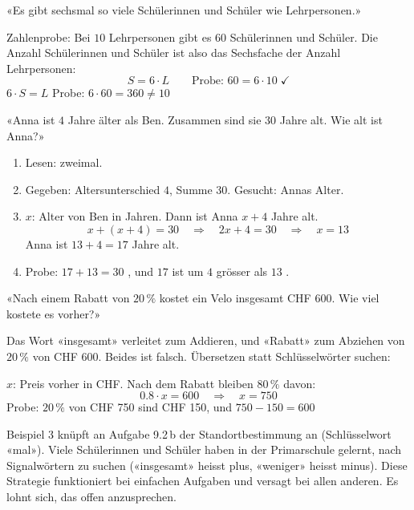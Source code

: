 \documentclass[11pt]{exam}
\begin{document}
\begin{beispiel}
«Es gibt sechsmal so viele Schülerinnen und Schüler wie Lehrpersonen.»

Zahlenprobe: Bei $10$ Lehrpersonen gibt es $60$ Schülerinnen und Schüler.
Die Anzahl Schülerinnen und Schüler ist also das Sechsfache der Anzahl
Lehrpersonen:
\[ S = 6 \cdot L \qquad\text{Probe: } 60 = 6 \cdot 10 \;\checkmark \]
\falsch\quad $6 \cdot S = L$ \qquad Probe: $6 \cdot 60 = 360 \neq 10$
\end{beispiel}

\begin{beispiel}
«Anna ist $4$ Jahre älter als Ben. Zusammen sind sie $30$ Jahre alt. Wie alt
ist Anna?»
\begin{enumerate}
  \item[1.] Lesen: zweimal.
  \item[2.] Gegeben: Altersunterschied $4$, Summe $30$. Gesucht: Annas Alter.
  \item[3.] $x$: Alter von Ben in Jahren. Dann ist Anna $x + 4$ Jahre alt.
            \[ x + (x + 4) = 30 \quad\Rightarrow\quad 2x + 4 = 30
               \quad\Rightarrow\quad x = 13 \]
            Anna ist $13 + 4 = 17$ Jahre alt.
  \item[4.] Probe: $17 + 13 = 30$ \checkmark, und $17$ ist um $4$ grösser als
            $13$ \checkmark.
\end{enumerate}
\end{beispiel}

\begin{beispiel}
«Nach einem Rabatt von $20\,\%$ kostet ein Velo insgesamt CHF 600. Wie viel
kostete es vorher?»

Das Wort «insgesamt» verleitet zum Addieren, und «Rabatt» zum Abziehen von
$20\,\%$ von CHF 600. Beides ist falsch. Übersetzen statt Schlüsselwörter
suchen:

$x$: Preis vorher in CHF. Nach dem Rabatt bleiben $80\,\%$ davon:
\[ 0.8 \cdot x = 600 \quad\Rightarrow\quad x = 750 \]
Probe: $20\,\%$ von CHF 750 sind CHF 150, und $750 - 150 = 600$ \checkmark
\end{beispiel}

\begin{lehrperson}[Beispiele]
Beispiel 3 knüpft an Aufgabe 9.2\,b der Standortbestimmung an (Schlüsselwort
«mal»). Viele Schülerinnen und Schüler haben in der Primarschule gelernt,
nach Signalwörtern zu suchen («insgesamt» heisst plus, «weniger» heisst
minus). Diese Strategie funktioniert bei einfachen Aufgaben und versagt bei
allen anderen. Es lohnt sich, das offen anzusprechen.
\end{lehrperson}
\end{document}
